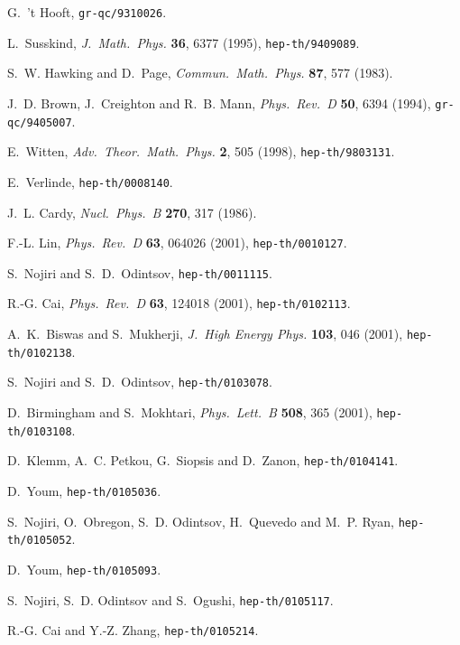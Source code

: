 \documentclass[a4paper,12pt]{article}
\begin{document}
\begin{thebibliography}{10}
\setlength{\itemsep}{0pt}
\raggedright
\renewcommand{\baselinestretch}{1}\normalfont

G.~{'t Hooft}, \texttt{gr-qc/9310026}.

L.~Susskind, \emph{J.~Math.~Phys.} \textbf{36}, 6377 (1995),
  \texttt{hep-th/9409089}.

S.~W. Hawking and D.~Page, \emph{Commun.~Math.~Phys.} \textbf{87}, 577 (1983).

J.~D. Brown, J.~Creighton and R.~B. Mann, \emph{Phys.~Rev.~D} \textbf{50}, 6394
  (1994), \texttt{gr-qc/9405007}.

E.~Witten, \emph{Adv.~Theor.~Math.~Phys.} \textbf{2}, 505 (1998),
  \texttt{hep-th/9803131}.

E.~Verlinde, \texttt{hep-th/0008140}.

J.~L. Cardy, \emph{Nucl.~Phys.~B} \textbf{270}, 317 (1986).

F.-L. Lin, \emph{Phys.~Rev.~D} \textbf{63}, 064026 (2001),
  \texttt{hep-th/0010127}.

S.~Nojiri and S.~D.~Odintsov,
\texttt{hep-th/0011115}.

R.-G. Cai, \emph{Phys.~Rev.~D} \textbf{63}, 124018 (2001),
  \texttt{hep-th/0102113}.

A.~K.~Biswas and S.~Mukherji,
 \emph{J.~High Energy Phys.} \textbf{103}, 046
  (2001), \texttt{hep-th/0102138}.

S.~Nojiri and S.~D.~Odintsov,
\texttt{hep-th/0103078}.

D.~Birmingham and S.~Mokhtari, \emph{Phys.~Lett.~B} \textbf{508}, 365 (2001),
  \texttt{hep-th/0103108}.

D.~Klemm, A.~C. Petkou, G.~Siopsis and D.~Zanon, \texttt{hep-th/0104141}.

D.~Youm, \texttt{hep-th/0105036}.

S.~Nojiri, O.~Obregon, S.~D. Odintsov, H.~Quevedo and M.~P. Ryan,
  \texttt{hep-th/0105052}.

D.~Youm, \texttt{hep-th/0105093}.

S.~Nojiri, S.~D. Odintsov and S.~Ogushi, \texttt{hep-th/0105117}.

R.-G. Cai and Y.-Z. Zhang, \texttt{hep-th/0105214}.


\end{thebibliography}
\end{document}
